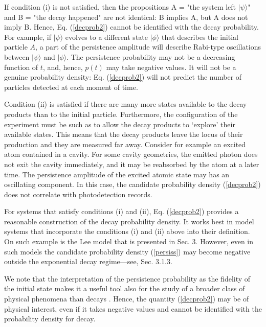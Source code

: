 \documentclass[12pt]{article}
\numberwithin{equation}{section}
\begin{document}
If condition (i) is not satisfied, then the propositions A = "the system left $|\psi\rangle$" and B = "the decay happened" are not identical: B implies A, but A does not imply B. Hence,  Eq. (\ref{decprob2}) cannot be identified with the decay probability. For example,  if
 $|\psi\rangle$ evolves to a different state $|\phi\rangle$ that describes the initial particle $A$,  a part of the persistence amplitude will describe  Rabi-type oscillations between $|\psi\rangle $ and $|\phi \rangle$. The persistence probability may not be a decreasing function of $t$, and, hence, $p(t)$ may take negative values. It will not be a genuine probability density: Eq. (\ref{decprob2}) will not predict the number of particles detected at each  moment of time.

Condition (ii) is satisfied if there are many more states available to the decay products than to the initial particle. Furthermore, the configuration of the experiment must be such as to allow the decay products to `explore' their available states. This means that the decay products  leave the locus of their production and they are measured far away. Consider for example an excited atom contained in a cavity. For some cavity geometries,  the emitted photon does not exit the cavity immediately, and it may be reabsorbed by the atom at a later time. The persistence amplitude of the excited atomic state may has an oscillating component. In this case, the candidate probability density (\ref{decprob2}) does not correlate with  photodetection records.


For systems that satisfy conditions (i) and (ii), Eq. (\ref{decprob2}) provides a  reasonable  construction of the decay probability density. It works best in model systems that incorporate the conditions (i) and (ii)  above into their definition. On such example is   the Lee model \cite{Lee} that is presented in   Sec. 3. However, even in such models the candidate probability density (\ref{persiss}) may become negative outside the exponential decay regime---see, Sec. 3.1.3.


We note that the interpretation of the persistence probability as the fidelity of the initial state makes it a useful tool also for the study of a broader class of physical phenomena than decays \cite{BPSZ}. Hence, the quantity (\ref{decprob2}) may be of physical interest, even if it takes negative values and cannot be identified with the probability density for decay.
 \medskip
\end{document}
